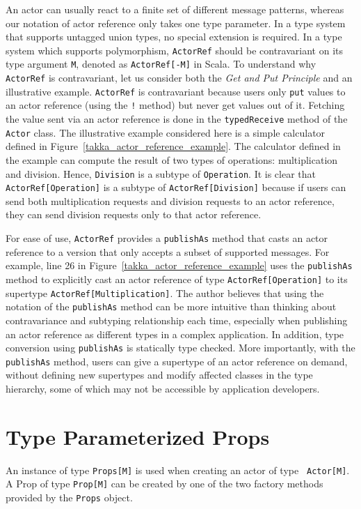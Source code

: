 An actor can usually react to a finite set of different message patterns, 
whereas our notation of actor reference only takes one type parameter.  In a 
type system that supports untagged union types, no special extension is
required.  In a type system which supports polymorphism, {\tt ActorRef} should
be contravariant on its type argument {\tt M}, denoted as {\tt ActorRef[-M]} in 
Scala.  To understand why {\tt ActorRef} is contravariant, let us consider both the 
{\it Get and Put Principle} and an illustrative example.   {\tt ActorRef} is 
contravariant because users only {\tt put} values to an actor reference (using the {\tt !} method) but 
never get values out of it.  Fetching the value sent via an actor reference is done
in the {\tt typedReceive} method of the {\tt Actor} class.  The illustrative example considered here is a 
simple calculator defined in Figure~\ref{takka_actor_reference_example}.
The calculator defined in the example can compute the result of two types of 
operations: multiplication and division.  Hence, {\tt Division} is a 
subtype of {\tt Operation}. It is clear that {\tt ActorRef[Operation]} is a 
subtype of {\tt ActorRef[Division]} because if users can send both 
multiplication requests and division requests to an actor reference, they can 
send division requests only to that actor reference.

For ease of use, {\tt ActorRef} provides a {\tt publishAs} method that 
casts an actor reference to a version that only accepts a subset of supported 
messages.  For example, line 26 in Figure~\ref{takka_actor_reference_example}
uses the {\tt publishAs} method to explicitly cast an actor reference of type
{\tt ActorRef[Operation]} to its supertype {\tt ActorRef[Multiplication]}.
The author believes that using the notation of the {\tt publishAs} method can be 
more intuitive than thinking about contravariance 
and subtyping relationship each time, especially when publishing an actor 
reference as different types in a complex application.  In addition, type 
conversion using {\tt publishAs} is statically type checked.  More importantly, 
with the {\tt publishAs} method, users can give a supertype of an actor 
reference on demand, without defining new supertypes and modify affected 
classes in the type hierarchy, some of which may not be accessible by application developers.

\section{Type Parameterized Props}
\label{takka_actor_porps}
An instance of type {\tt Props[M]} is used when creating an actor of type {\tt 
Actor[M]}.  A Prop of type {\tt Prop[M]} can be created by one of 
the two factory methods provided by the {\tt Props} object.


